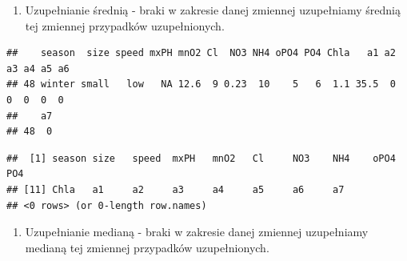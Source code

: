 \documentclass[
]{book}
\newenvironment{Shaded}{\begin{snugshade}}{\end{snugshade}}
\newcommand{\DataTypeTok}[1]{\textcolor[rgb]{0.13,0.29,0.53}{#1}}
\newcommand{\KeywordTok}[1]{\textcolor[rgb]{0.13,0.29,0.53}{\textbf{#1}}}
\newcommand{\NormalTok}[1]{#1}
\newcommand{\OperatorTok}[1]{\textcolor[rgb]{0.81,0.36,0.00}{\textbf{#1}}}
\newcommand{\StringTok}[1]{\textcolor[rgb]{0.31,0.60,0.02}{#1}}
\providecommand{\tightlist}{%
  \setlength{\itemsep}{0pt}\setlength{\parskip}{0pt}}
\theoremstyle{plain}
\theoremstyle{definition}
\theoremstyle{definition}
\theoremstyle{definition}
\theoremstyle{definition}
\theoremstyle{remark}
\begin{document}
\begin{enumerate}
\def\labelenumi{\arabic{enumi}.}
\tightlist
\item
  Uzupełnianie średnią - braki w zakresie danej zmiennej uzupełniamy średnią tej zmiennej przypadków uzupełnionych.
\end{enumerate}

\begin{Shaded}
\end{Shaded}

\begin{verbatim}
##    season  size speed mxPH mnO2 Cl  NO3 NH4 oPO4 PO4 Chla   a1 a2 a3 a4 a5 a6
## 48 winter small   low   NA 12.6  9 0.23  10    5   6  1.1 35.5  0  0  0  0  0
##    a7
## 48  0
\end{verbatim}

\begin{Shaded}
\end{Shaded}

\begin{verbatim}
##  [1] season size   speed  mxPH   mnO2   Cl     NO3    NH4    oPO4   PO4   
## [11] Chla   a1     a2     a3     a4     a5     a6     a7    
## <0 rows> (or 0-length row.names)
\end{verbatim}

\begin{enumerate}
\def\labelenumi{\arabic{enumi}.}
\setcounter{enumi}{1}
\tightlist
\item
  Uzupełnianie medianą - braki w zakresie danej zmiennej uzupełniamy medianą tej zmiennej przypadków uzupełnionych.
\end{enumerate}

\begin{Shaded}
\end{Shaded}
\end{document}
